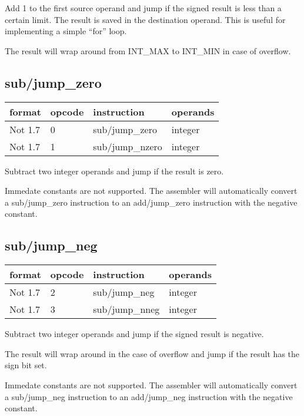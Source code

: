 \documentclass[forwardcom.tex]{subfiles}
\begin{document}
Add 1 to the first source operand and jump if the signed result is less than a certain limit. The result is saved in the destination operand. This is useful for implementing a simple ``for'' loop.
\vv

The result will wrap around from INT\_MAX to INT\_MIN in case of overflow. 
\vv


\subsection{sub/jump\_zero}
\label{table:subJumpZeroInstruction}
\begin{tabular}{|p{20mm}|p{12mm}|p{56mm}|p{50mm}|}
\hline
\bfseries format & \bfseries opcode & \bfseries instruction & \bfseries operands \\ \hline
Not 1.7 &  0 & sub/jump\_zero & integer \\ \hline
Not 1.7 &  1 & sub/jump\_nzero  & integer\\ \hline
\end{tabular}
\vv

Subtract two integer operands and jump if the result is zero.
\vv

Immedate constants are not supported. The assembler will automatically convert a sub/jump\_zero instruction to an add/jump\_zero instruction with the negative constant.
\vv

\subsection{sub/jump\_neg}
\label{table:subJumpNegInstruction}
\begin{tabular}{|p{20mm}|p{12mm}|p{56mm}|p{50mm}|}
\hline
\bfseries format & \bfseries opcode & \bfseries instruction & \bfseries operands \\ \hline
Not 1.7 &  2 & sub/jump\_neg & integer \\ \hline
Not 1.7 &  3 & sub/jump\_nneg & integer\\ \hline
\end{tabular}
\vv

Subtract two integer operands and jump if the signed result is negative.

The result will wrap around in the case of overflow and jump if the result has the sign bit set.
\vv

Immedate constants are not supported. The assembler will automatically convert a sub/jump\_neg instruction to an add/jump\_neg instruction with the negative constant.
\vv
\end{document}
